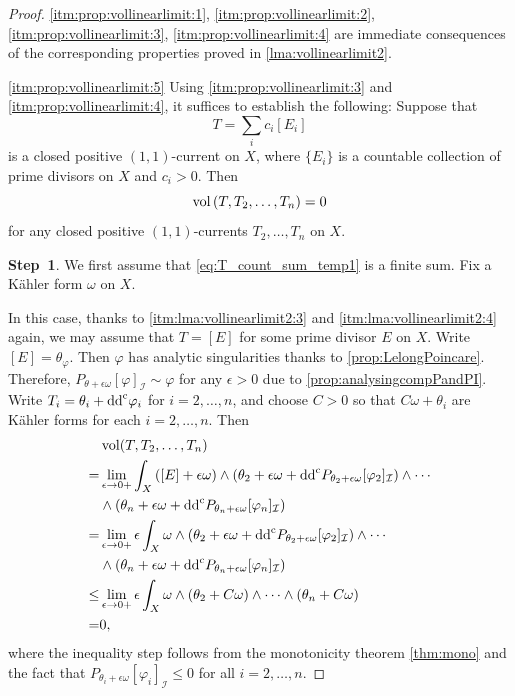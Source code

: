 \begin{proof}
    \ref{itm:prop:vollinearlimit:1}, \ref{itm:prop:vollinearlimit:2}, \ref{itm:prop:vollinearlimit:3}, \ref{itm:prop:vollinearlimit:4} are immediate consequences of the corresponding properties proved in \cref{lma:vollinearlimit2}.

    \ref{itm:prop:vollinearlimit:5} Using \ref{itm:prop:vollinearlimit:3} and \ref{itm:prop:vollinearlimit:4}, it suffices to establish the following: Suppose that
    \begin{equation}\label{eq:T_count_sum_temp1}
        T=\sum_i c_i[E_i]
    \end{equation}
    is a closed positive $(1,1)$-current on $X$, where $\{E_i\}$ is a countable collection of prime divisors on $X$ and $c_i>0$. Then
    \begin{equation}\label{eq:volTT2Tn_temp1}
    \operatorname{vol}\left(T,T_2,\ldots,T_n \right)=0
    \end{equation}
    for any closed positive $(1,1)$-currents $T_2,\ldots,T_n$ on $X$.

    \textbf{Step~1}. We first assume that \eqref{eq:T_count_sum_temp1} is a finite sum. Fix a Kähler form $\omega$ on $X$.

    In this case, thanks to \ref{itm:lma:vollinearlimit2:3} and \ref{itm:lma:vollinearlimit2:4} again, we may assume that $T=[E]$ for some prime divisor $E$ on $X$. Write $[E]=\theta_{\varphi}$. Then $\varphi$ has analytic singularities thanks to \cref{prop:LelongPoincare}. Therefore, $P_{\theta+\epsilon\omega}[\varphi]_{\mathcal{I}}\sim \varphi$ for any $\epsilon>0$ due to \cref{prop:analysingcompPandPI}. Write $T_i=\theta_i+\mathrm{dd}^{\mathrm{c}} \varphi_i$ for $i=2,\ldots,n$, and choose $C>0$ so that $C\omega+\theta_i$ are Kähler forms for each $i=2,\ldots,n$. Then
    \[
    \begin{aligned}
    &\operatorname{vol}(T,T_2,\ldots,T_n)\\
    =& \lim_{\epsilon\to 0+} \int_X \left([E]+\epsilon\omega\right)\wedge \left( \theta_2+\epsilon\omega+\mathrm{dd}^{\mathrm{c}} P_{\theta_2+\epsilon\omega}[\varphi_2]_{\mathcal{I}}\right)\wedge \cdots \\
    &\wedge \left( \theta_n+\epsilon\omega+\mathrm{dd}^{\mathrm{c}} P_{\theta_n+\epsilon\omega}[\varphi_n]_{\mathcal{I}}\right)\\
    =&\lim_{\epsilon\to 0+} \epsilon\int_X \omega \wedge \left( \theta_2+\epsilon\omega+\mathrm{dd}^{\mathrm{c}} P_{\theta_2+\epsilon\omega}[\varphi_2]_{\mathcal{I}}\right)\wedge \cdots \\
    &\wedge \left( \theta_n+\epsilon\omega+\mathrm{dd}^{\mathrm{c}} P_{\theta_n+\epsilon\omega}[\varphi_n]_{\mathcal{I}}\right)\\
    \leq &\lim_{\epsilon\to 0+} \epsilon\int_X \omega \wedge \left( \theta_2+C\omega\right)\wedge \cdots \wedge \left( \theta_n+C\omega\right)\\
    =&0,
    \end{aligned}
    \]
    where the inequality step follows from the monotonicity theorem \cref{thm:mono} and the fact that $P_{\theta_i+\epsilon\omega}[\varphi_i]_{\mathcal{I}}\leq 0$ for all $i=2,\ldots,n$.


\end{proof}
